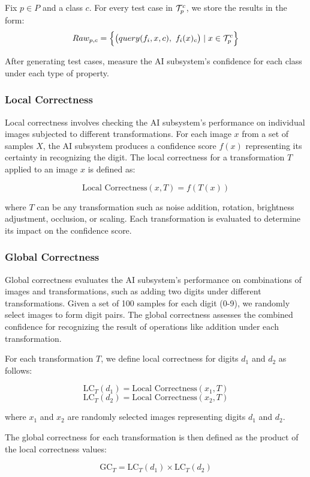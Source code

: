 Fix $p\in P$ and a class $c$. For every test case in $\mathcal{T}_p^c$, we store the results in the form:
\[Raw_{p,c} = \Big\{\big(query(f_i,x,c),\ f_i(x)_c\big) \mid x \in \mathcal{T}_p^c\Big\}\]

After generating test cases, measure the AI subsystem's confidence for each class under each type of property.

\subsubsection{Local Correctness}

Local correctness involves checking the AI subsystem's performance on individual images subjected to different transformations. For each image $x$ from a set of samples $X$, the AI subsystem produces a confidence score $f(x)$ representing its certainty in recognizing the digit. The local correctness for a transformation $T$ applied to an image $x$ is defined as:

\[ \text{Local Correctness}(x, T) = f(T(x)) \]

where $T$ can be any transformation such as noise addition, rotation, brightness adjustment, occlusion, or scaling. Each transformation is evaluated to determine its impact on the confidence score.

\subsubsection{Global Correctness}

Global correctness evaluates the AI subsystem's performance on combinations of images and transformations, such as adding two digits under different transformations. Given a set of 100 samples for each digit (0-9), we randomly select images to form digit pairs. The global correctness assesses the combined confidence for recognizing the result of operations like addition under each transformation.

For each transformation $T$, we define local correctness for digits $d_1$ and $d_2$ as follows:

\[ \text{LC}_{T}(d_1) = \text{Local Correctness}(x_1, T) \]
\[ \text{LC}_{T}(d_2) = \text{Local Correctness}(x_2, T) \]

where $x_1$ and $x_2$ are randomly selected images representing digits $d_1$ and $d_2$.

The global correctness for each transformation is then defined as the product of the local correctness values:

\[ \text{GC}_{T} = \text{LC}_{T}(d_1) \times \text{LC}_{T}(d_2) \]

